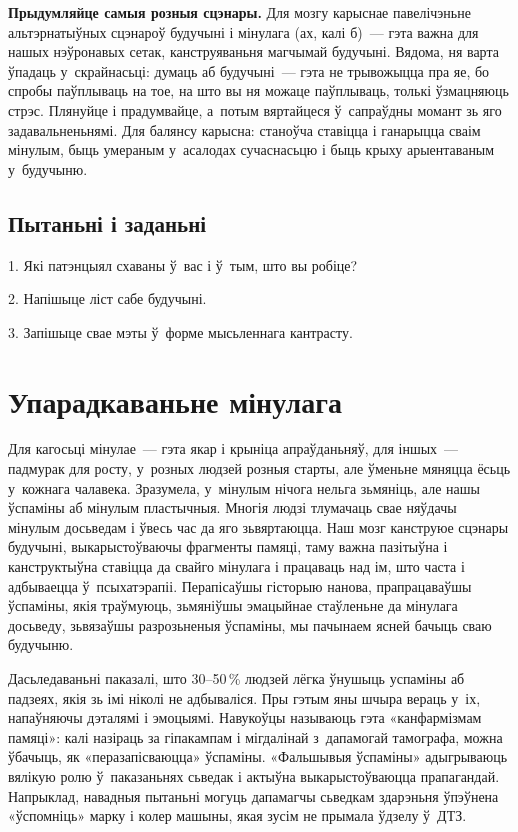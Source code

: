 \textbf{Прыдумляйце самыя розныя сцэнары.} Для мозгу карыснае павелічэньне альтэрнатыўных сцэнароў будучыні і мінулага (ах, калі б)~--- гэта важна для нашых нэўронавых сетак, канструяваньня магчымай будучыні. Вядома, ня варта ўпадаць у~скрайнасьці: думаць аб будучыні~--- гэта не трывожыцца пра яе, бо спробы паўплываць на тое, на што вы ня можаце паўплываць, толькі ўзмацняюць стрэс. Плянуйце і прадумвайце, а~потым вяртайцеся ў~сапраўдны момант зь яго задавальненьнямі. Для балянсу карысна: станоўча ставіцца і ганарыцца сваім мінулым, быць умераным у~асалодах сучаснасьцю і быць крыху арыентаваным у~будучыню.

\subsection*{Пытаньні і заданьні}

1. Які патэнцыял схаваны ў~вас і ў~тым, што вы робіце?

2. Напішыце ліст сабе будучыні.

3. Запішыце свае мэты ў~форме мысьленнага кантрасту.


\section{Упарадкаваньне мінулага}

Для кагосьці мінулае~--- гэта якар і крыніца апраўданьняў, для іншых~--- падмурак для росту, у~розных людзей розныя старты, але ўменьне мяняцца ёсьць у~кожнага чалавека. Зразумела, у~мінулым нічога нельга зьмяніць, але нашы ўспаміны аб мінулым пластычныя. Многія людзі тлумачаць свае няўдачы мінулым досьведам і ўвесь час да яго зьвяртаюцца. Наш мозг канструюе сцэнары будучыні, выкарыстоўваючы фрагменты памяці, таму важна пазітыўна і канструктыўна ставіцца да свайго мінулага і працаваць над ім, што часта і адбываецца ў~псыхатэрапіі. Перапісаўшы гісторыю нанова, прапрацаваўшы ўспаміны, якія траўмуюць, зьмяніўшы эмацыйнае стаўленьне да мінулага досьведу, зьвязаўшы разрозьненыя ўспаміны, мы пачынаем ясней бачыць сваю будучыню.


Дасьледаваньні паказалі, што 30--50\,\% людзей лёгка ўнушыць успаміны аб падзеях, якія зь імі ніколі не адбываліся. Пры гэтым яны шчыра вераць у~іх, напаўняючы дэталямі і эмоцыямі. Навукоўцы называюць гэта «канфармізмам памяці»: калі назіраць за гіпакампам і мігдалінай з~дапамогай тамографа, можна ўбачыць, як «перазапісваюцца» ўспаміны. «Фальшывыя ўспаміны» адыгрываюць вялікую ролю ў~паказаньнях сьведак і актыўна выкарыстоўваюцца прапагандай. Напрыклад, навадныя пытаньні могуць дапамагчы сьведкам здарэньня ўпэўнена «ўспомніць» марку і колер машыны, якая зусім не прымала ўдзелу ў~ДТЗ.

